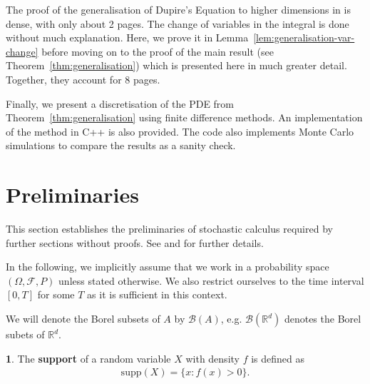 \documentclass[english]{article}
\numberwithin{equation}{section}
\numberwithin{figure}{section}
\theoremstyle{bolddescit}
\theoremstyle{definition}
\newtheorem{definition}[theorem]{\protect\definitionname}
\theoremstyle{definition}
\theoremstyle{plain}
\theoremstyle{plain}
\theoremstyle{bolddesc}
\theoremstyle{plain}
\theoremstyle{remark}
\providecommand{\definitionname}{Definition}
\begin{document}
The proof of the generalisation of Dupire's Equation to higher dimensions in \textcite{pablo_amster_towards_2009} is dense, with only about 2 pages. The change of variables in the integral is done without much explanation. Here, we prove it in Lemma~\ref{lem:generalisation-var-change} before moving on to the proof of the main result (see Theorem~\ref{thm:generalisation}) which is presented here in much greater detail. Together, they account for 8 pages.

Finally, we present a discretisation of the PDE from Theorem~\ref{thm:generalisation} using finite difference methods. An implementation of the method in C++ is also provided. The code also implements Monte Carlo simulations to compare the results as a sanity check.

\section{Preliminaries}\label{sec:preliminaries}


This section establishes the preliminaries of stochastic calculus required by further sections without proofs. See \textcite{capinski_stochastic_2012} and \textcite{capinski_blackscholes_2012} for further details.

In the following, we implicitly assume that we work in a probability space $(\Omega, \mathcal{F}, P)$ unless stated otherwise. We also restrict ourselves to the time interval $[0,T]$ for some $T$ as it is sufficient in this context.

We will denote the Borel subsets of $A$ by $\mathcal{B}(A)$, e.g. $\mathcal{B}(\mathbb{R}^d)$ denotes the Borel subets of $\mathbb{R}^d$.

\begin{definition}
  The \textbf{support} of a random variable $X$ with density $f$ is defined as
  \begin{align*}
    \mathrm{supp}(X) = \{x : f(x) > 0\}.
  \end{align*}
\end{definition}
\end{document}
